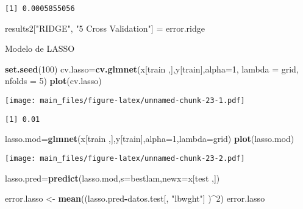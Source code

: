 \documentclass[]{article}
\newenvironment{Shaded}{\begin{snugshade}}{\end{snugshade}}
\newcommand{\KeywordTok}[1]{\textcolor[rgb]{0.13,0.29,0.53}{\textbf{#1}}}
\newcommand{\DataTypeTok}[1]{\textcolor[rgb]{0.13,0.29,0.53}{#1}}
\newcommand{\DecValTok}[1]{\textcolor[rgb]{0.00,0.00,0.81}{#1}}
\newcommand{\StringTok}[1]{\textcolor[rgb]{0.31,0.60,0.02}{#1}}
\newcommand{\OperatorTok}[1]{\textcolor[rgb]{0.81,0.36,0.00}{\textbf{#1}}}
\newcommand{\NormalTok}[1]{#1}
\begin{document}
\begin{verbatim}
[1] 0.0005855056
\end{verbatim}

\begin{Shaded}
\begin{Highlighting}[]
\NormalTok{results2[}\StringTok{"RIDGE"}\NormalTok{, }\StringTok{"5 Cross Validation"}\NormalTok{] =}\StringTok{ }\NormalTok{error.ridge}
\end{Highlighting}
\end{Shaded}

Modelo de LASSO

\begin{Shaded}
\begin{Highlighting}[]
\KeywordTok{set.seed}\NormalTok{(}\DecValTok{100}\NormalTok{)}
\NormalTok{cv.lasso=}\KeywordTok{cv.glmnet}\NormalTok{(x[train ,],y[train],}\DataTypeTok{alpha=}\DecValTok{1}\NormalTok{, }\DataTypeTok{lambda =}\NormalTok{ grid, }\DataTypeTok{nfolds =} \DecValTok{5}\NormalTok{)}
\KeywordTok{plot}\NormalTok{(cv.lasso)}
\end{Highlighting}
\end{Shaded}

\texttt{[image: main\_files/figure-latex/unnamed-chunk-23-1.pdf]}

\begin{Shaded}
\end{Shaded}

\begin{verbatim}
[1] 0.01
\end{verbatim}

\begin{Shaded}
\begin{Highlighting}[]
\NormalTok{lasso.mod=}\KeywordTok{glmnet}\NormalTok{(x[train ,],y[train],}\DataTypeTok{alpha=}\DecValTok{1}\NormalTok{,}\DataTypeTok{lambda=}\NormalTok{grid)}
\KeywordTok{plot}\NormalTok{(lasso.mod)}
\end{Highlighting}
\end{Shaded}

\texttt{[image: main\_files/figure-latex/unnamed-chunk-23-2.pdf]}

\begin{Shaded}
\begin{Highlighting}[]
\NormalTok{lasso.pred=}\KeywordTok{predict}\NormalTok{(lasso.mod,}\DataTypeTok{s=}\NormalTok{bestlam,}\DataTypeTok{newx=}\NormalTok{x[test ,])}

\NormalTok{error.lasso <-}\StringTok{ }\KeywordTok{mean}\NormalTok{((lasso.pred}\OperatorTok{-}\NormalTok{datos.test[, }\StringTok{"lbwght"}\NormalTok{] )}\OperatorTok{^}\DecValTok{2}\NormalTok{)}
\NormalTok{error.lasso}
\end{Highlighting}
\end{Shaded}
\end{document}

